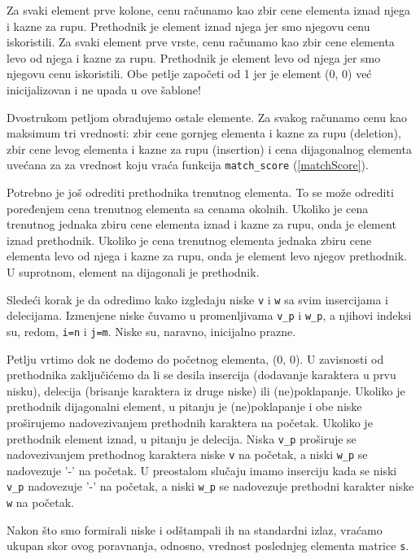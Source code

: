 Za svaki element prve kolone, cenu računamo kao zbir cene elementa iznad njega i kazne za rupu. Prethodnik je element iznad njega jer smo njegovu cenu iskoristili. Za svaki element prve vrste, cenu računamo kao zbir cene elementa levo od njega i kazne za rupu. Prethodnik je element levo od njega jer smo njegovu cenu iskoristili. Obe petlje započeti od 1 jer je element (0, 0) već inicijalizovan i ne upada u ove šablone!

Dvostrukom petljom obrađujemo ostale elemente. Za svakog računamo cenu kao maksimum tri vrednosti: zbir cene gornjeg elementa i kazne za rupu (deletion), zbir cene levog elementa i kazne za rupu (insertion) i cena dijagonalnog elementa uvećana za za vrednost koju vraća funkcija \texttt{match\_score} (\ref{matchScore}). 

Potrebno je još odrediti prethodnika trenutnog elementa. To se može odrediti poređenjem cena trenutnog elementa sa cenama okolnih. Ukoliko je cena trenutnog jednaka zbiru cene elementa iznad i kazne za rupu, onda je element iznad prethodnik. Ukoliko je cena trenutnog elementa jednaka zbiru cene elementa levo od njega i kazne za rupu, onda je element levo njegov prethodnik. U suprotnom, element na dijagonali je prethodnik.

Sledeći korak je da odredimo kako izgledaju niske \texttt{v} i \texttt{w} sa svim insercijama i delecijama. Izmenjene niske čuvamo u promenljivama \texttt{v\_p} i \texttt{w\_p}, a njihovi indeksi su, redom, \texttt{i=n} i \texttt{j=m}. Niske su, naravno, inicijalno prazne.

Petlju vrtimo dok ne dođemo do početnog elementa, (0, 0). U zavisnosti od prethodnika zaključićemo da li se desila insercija (dodavanje karaktera u prvu nisku), delecija (brisanje karaktera iz druge niske) ili (ne)poklapanje. Ukoliko je prethodnik dijagonalni element, u pitanju je (ne)poklapanje i obe niske proširujemo nadovezivanjem prethodnih karaktera na početak. Ukoliko je prethodnik element iznad, u pitanju je delecija. Niska \texttt{v\_p} proširuje se nadovezivanjem prethodnog karaktera niske \texttt{v} na početak, a niski \texttt{w\_p} se nadovezuje '-' na početak. U preostalom slučaju imamo inserciju kada se niski \texttt{v\_p} nadovezuje '-' na početak, a niski \texttt{w\_p} se nadovezuje prethodni karakter niske \texttt{w} na početak.

Nakon što smo formirali niske i odštampali ih na standardni izlaz, vraćamo ukupan skor ovog poravnanja, odnosno, vrednost poslednjeg elementa matrice \texttt{s}.


